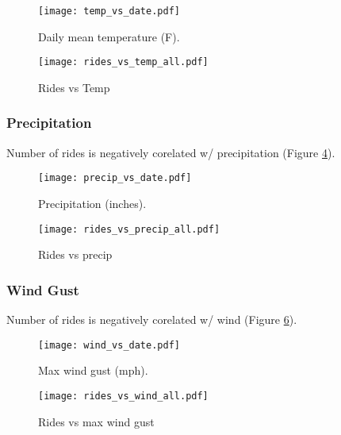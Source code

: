 \documentclass[11pt]{article}
\begin{document}
\begin{figure}[h]
\texttt{[image: temp\_vs\_date.pdf]}
\caption{Daily mean temperature (F).}
\label{temps}
\end{figure}



\begin{figure}[h]
\texttt{[image: rides\_vs\_temp\_all.pdf]}
\caption{Rides vs Temp}
\label{rides_vs_temp}
\end{figure}




\clearpage
\subsubsection{Precipitation}

Number of rides is negatively corelated w/ precipitation (Figure \ref{rides_vs_precip}).

\begin{figure}[h]
\texttt{[image: precip\_vs\_date.pdf]}
\caption{Precipitation (inches).}
\label{precip}
\end{figure}

\begin{figure}[h]
\texttt{[image: rides\_vs\_precip\_all.pdf]}
\caption{Rides vs precip}
\label{rides_vs_precip}
\end{figure}






\clearpage
\subsubsection{Wind Gust}

Number of rides is negatively corelated w/ wind (Figure \ref{rides_vs_wind}).


\begin{figure}[h]
\texttt{[image: wind\_vs\_date.pdf]}
\caption{Max wind gust (mph).}
\label{wind}
\end{figure}

\begin{figure}[h]
\texttt{[image: rides\_vs\_wind\_all.pdf]}
\caption{Rides vs max wind gust}
\label{rides_vs_wind}
\end{figure}
\end{document}
